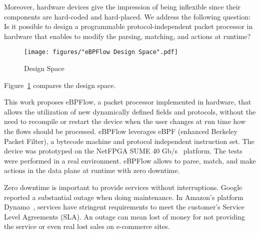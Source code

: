 
Moreover, hardware devices give the impression of being inflexible since their components are hard-coded and hard-placed. We address the following question: Is it possible to design a programmable protocol-independent packet processor in hardware that enables to modify the parsing, matching, and actions at runtime? 

 \begin{figure}[!htp]
 \centering
\texttt{[image: figures/"eBPFlow Design Space".pdf]}
 \caption{Design Space}
 \label{fig:Comparison}
 \end{figure}

Figure~\ref{fig:Comparison} compares the design space.


This work proposes eBPFlow, a packet processor implemented in hardware, that allows the utilization of new dynamically defined fields and protocols, without the need to recompile or restart the device when the user changes at run time how the flows should be processed. 
eBPFlow leverages eBPF (enhanced Berkeley Packet Filter), a bytecode machine and protocol independent instruction set. %
The device was prototyped on the NetFPGA SUME 40 Gb/s~\cite{SUME2014} platform. The tests were performed in a real environment. eBPFlow allows to parse, match, and make actions in the data plane at runtime with zero downtime.

Zero downtime is important to provide services without interruptions.
Google~\cite{Jain:2013:BEG:2486001.2486019} reported a substantial outage when doing maintenance. In  Amazon's platform Dynamo~\cite{DeCandia:2007:DAH:1294261.1294281},  services have stringent requirements to meet the customer's Service Level Agreements (SLA).
An outage can mean lost of money for not providing the service or even real lost sales on e-commerce sites.



